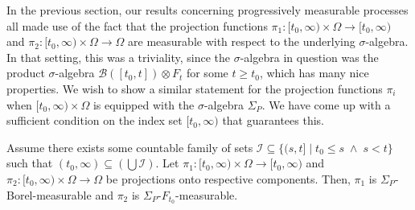 In the previous section, our results concerning progressively measurable processes all made use of the fact that the projection functions $\pi_1 : [t_0, \infty) \times \Omega \rightarrow [t_0, \infty)$ and $\pi_2 : [t_0, \infty) \times \Omega \rightarrow \Omega$ are measurable with respect to the underlying $\sigma$-algebra. In that setting, this was a triviality, since the $\sigma$-algebra in question was the product $\sigma$-algebra $\mathcal{B}([t_0, t]) \otimes F_t$ for some $t \ge t_0$, which has many nice properties. We wish to show a similar statement for the projection functions $\pi_i$ when $[t_0, \infty) \times \Omega$ is equipped with the $\sigma$-algebra $\Sigma_P$. We have come up with a sufficient condition on the index set $[t_0, \infty)$ that guarantees this.

\begin{lemma}
	Assume there exists some countable family of sets $\mathcal{I} \subseteq \{(s, t] \;\vert\; t_0 \le s \;\wedge\; s < t\}$ such that $(t_0, \infty) \subseteq (\bigcup \mathcal{I})$. Let $\pi_1 : [t_0, \infty) \times \Omega \rightarrow [t_0, \infty)$ and $\pi_2 : [t_0, \infty) \times \Omega \rightarrow \Omega$ be projections onto respective components. Then, $\pi_1$ is $\Sigma_P$-Borel-measurable and $\pi_2$ is $\Sigma_P$-$F_{t_0}$-measurable.
\end{lemma}
